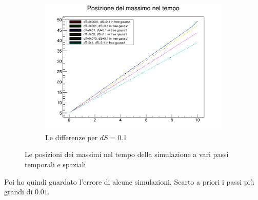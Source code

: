 \begin{figure}[ht]
\begin{subfigure}[b]{0.5\textwidth}
\includegraphics[width=\textwidth]{IMG/v_g1_01}
\caption[Differenze in 0.1]{Le differenze per $dS = 0.1$}
\end{subfigure}
\caption{Le posizioni dei massimi nel tempo della simulazione a vari passi temporali  e spaziali}\label{fig:velocita}
\end{figure}

Poi ho quindi guardato l'errore di alcune simulazioni. Scarto a priori i passi pi\`u grandi di $0.01$.

